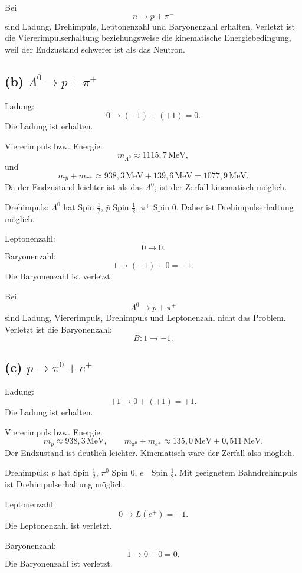 \documentclass[11pt,a4paper]{scrartcl}
\begin{document}
\begin{answerbox}
Bei
\[
n\to p+\pi^-
\]
sind Ladung, Drehimpuls, Leptonenzahl und Baryonenzahl erhalten. Verletzt ist die Viererimpulserhaltung beziehungsweise die kinematische Energiebedingung, weil der Endzustand schwerer ist als das Neutron.
\end{answerbox}

\subsection*{(b) $\Lambda^0\to\overline p+\pi^+$}

\begin{calculationbox}
Ladung:
\[
0\to (-1)+(+1)=0.
\]
Die Ladung ist erhalten.

\begin{calculationbox}
Viererimpuls bzw. Energie:
\[
m_{\Lambda^0}\approx1115{,}7\,\mathrm{MeV},
\]
und
\[
m_{\bar p}+m_{\pi^+}\approx938{,}3\,\mathrm{MeV}+139{,}6\,\mathrm{MeV}
=1077{,}9\,\mathrm{MeV}.
\]
Da der Endzustand leichter ist als das $\Lambda^0$, ist der Zerfall kinematisch möglich.
\end{calculationbox}

\begin{calculationbox}
Drehimpuls: $\Lambda^0$ hat Spin $\frac12$, $\bar p$ Spin $\frac12$, $\pi^+$ Spin $0$. Daher ist Drehimpulserhaltung möglich.

Leptonenzahl:
\[
0\to0.
\]
Baryonenzahl:
\[
1\to (-1)+0=-1.
\]
Die Baryonenzahl ist verletzt.
\end{calculationbox}
\end{calculationbox}

\begin{answerbox}
Bei
\[
\Lambda^0\to\bar p+\pi^+
\]
sind Ladung, Viererimpuls, Drehimpuls und Leptonenzahl nicht das Problem. Verletzt ist die Baryonenzahl:
\[
\boxed{B:1\to -1}.
\]
\end{answerbox}

\subsection*{(c) $p\to\pi^0+e^+$}

\begin{calculationbox}
Ladung:
\[
+1\to0+(+1)=+1.
\]
Die Ladung ist erhalten.

\begin{calculationbox}
Viererimpuls bzw. Energie:
\[
m_p\approx938{,}3\,\mathrm{MeV},
\qquad
m_{\pi^0}+m_{e^+}\approx135{,}0\,\mathrm{MeV}+0{,}511\,\mathrm{MeV}.
\]
Der Endzustand ist deutlich leichter. Kinematisch wäre der Zerfall also möglich.
\end{calculationbox}

\begin{calculationbox}
Drehimpuls: $p$ hat Spin $\frac12$, $\pi^0$ Spin $0$, $e^+$ Spin $\frac12$. Mit geeignetem Bahndrehimpuls ist Drehimpulserhaltung möglich.

Leptonenzahl:
\[
0\to L(e^+)=-1.
\]
Die Leptonenzahl ist verletzt.

Baryonenzahl:
\[
1\to0+0=0.
\]
Die Baryonenzahl ist verletzt.
\end{calculationbox}
\end{calculationbox}
\end{document}
